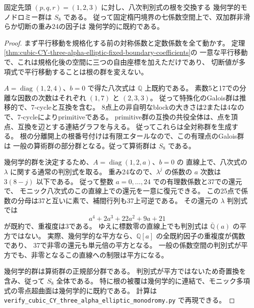 \begin{theorem}\label{thm:cubic-CY-three-alpha-elliptic-eight-monodromy}
固定先頭 $(p,q,r)=(1,2,3)$ に対し、八次判別式の根を交換する
幾何学的モノドロミー群は $S_8$ である。
従って固定楕円境界の七係数空間上で、双加群非滑らか切断の重み24の因子は
幾何学的に既約である。
\end{theorem}
\begin{proof}
まず平行移動を規格化する前の対称係数と定数係数を全て動かす。
定理\ref{thm:cubic-CY-three-alpha-elliptic-fixed-boundary-coefficients}の
一意な平行移動で、これは規格化後の空間に三つの自由座標を加えただけであり、
切断値が多項式で平行移動することは根の群を変えない。

$A=\operatorname{diag}(1,2,4)$、$b=0$ で得た八次式は $\mathbb Q$ 上既約である。
素数5と17での分離な因数の次数はそれぞれ $(1,7)$ と $(2,3,3)$。
従って特殊化のGalois群は推移的で、7-cycleと互換を含む。
8点上の非自明なblockの大きさは2または4なので、7-cycleによりprimitiveである。
primitive群の互換の共役全体は、点を頂点、互換を辺とする連結グラフを与える。
従ってこれらは全対称群を生成する。
根の分離開上の根番号付けは有限エタールなので、この有理点のGalois群は
一般の算術群の部分群となる。従って算術群は $S_8$ である。

幾何学的群を決定するため、$A=\operatorname{diag}(1,2,a)$、$b=0$ の
直線上で、八次式の $\lambda$ に関する通常の判別式を取る。
重み24なので、$\lambda^j$ の係数の $a$ 次数は $3(8-j)$ 以下である。
従って整数 $a=0,\ldots,24$ での有理数係数と37での還元で、
モニック八次式のこの直線上での還元を一意に復元できる。
この25点で係数の分母は37と互いに素で、補間行列も37上可逆である。
その還元の $\lambda$ 判別式では
\[
 a^4+2a^3+22a^2+9a+21
\]
が既約で、重複度は3である。
ゆえに標数零の直線上でも判別式は $\overline{\mathbb Q}(a)$ の平方ではない。
実際、幾何学的な平方なら、$\mathbb Q[a]$ の全既約因子の重複度が偶数であり、
37で非零の還元も単元倍の平方となる。
一般の係数空間の判別式が平方でも、非零となるこの直線への制限は平方になる。

幾何学的群は算術群の正規部分群である。
判別式が平方ではないため奇置換を含み、従って $S_8$ 全体である。
特に根の被覆は幾何学的に連結で、モニック多項式の零点超曲面は幾何学的に既約である。
計算は
\texttt{verify\_cubic\_CY\_\allowbreak{}three\_alpha\_elliptic\_\allowbreak{}monodromy.py}
で再現できる。
\end{proof}
